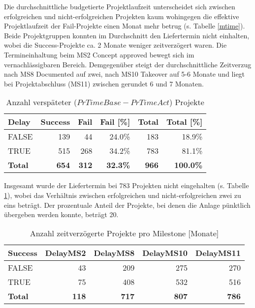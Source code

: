 Die durchschnittliche budgetierte Projektlaufzeit unterscheidet sich zwischen erfolgreichen und  nicht-erfolgreichen Projekten kaum wohingegen die effektive Projektlaufzeit der Fail-Projekte einen Monat mehr betrug (s. Tabelle \ref{mtime}). Beide Projektgruppen konnten im Durchschnitt den Liefertermin nicht einhalten, wobei die Success-Projekte ca. 2 Monate weniger zeitverzögert waren. Die Termineinhaltung beim MS2 Concept approved bewegt sich im vernachlässigbaren Bereich. Demgegenüber steigt der durchschnittliche Zeitverzug nach MS8 Documented auf zwei, nach MS10 Takeover auf 5-6 Monate und liegt bei Projektabschluss (MS11) zwischen gerundet 6 und 7 Monaten.
\begin{table}[H]
	\centering
	\caption{Anzahl verspäteter ($PrTimeBase-PrTimeAct$) Projekte}
	\begin{tabular}{lrrrrr}
		\textbf{Delay} & \multicolumn{1}{l}{\textbf{Success}} & \multicolumn{1}{l}{\textbf{Fail}} & \multicolumn{1}{l}{\textbf{Fail [\%]}} & \multicolumn{1}{l}{\textbf{Total}} & \multicolumn{1}{l}{\textbf{Total [\%]}} \\ \hline
		FALSE & 139   & 44    & 24.0\% & 183   & 18.9\% \\
		TRUE  & 515   & 268   & 34.2\% & 783   & 81.1\% \\\hline
		\textbf{Total} & \textbf{654} & \textbf{312} & \textbf{32.3\%} & \textbf{966} & \textbf{100.0\%} \\
	\end{tabular}%
	\label{fdelay}%
\end{table}%
Insgesamt wurde der Liefertermin bei 783 Projekten nicht eingehalten (s. Tabelle \ref{fdelay}), wobei das Verhältnis zwischen erfolgreichen und nicht-erfolgreichen zwei zu eins beträgt. Der prozentuale Anteil der Projekte, bei denen die Anlage pünktlich übergeben werden konnte, beträgt 20. 
\begin{table}[H]
	\centering
	\caption{Anzahl zeitverzögerte Projekte pro Milestone [Monate]}
	\begin{tabular}{lrrrr}
		\textbf{Success} & \multicolumn{1}{l}{\textbf{DelayMS2}} & \multicolumn{1}{l}{\textbf{DelayMS8}} & \multicolumn{1}{l}{\textbf{DelayMS10}} & \multicolumn{1}{l}{\textbf{DelayMS11}} \\\hline
		FALSE & 43    & 209   & 275   & 270 \\
		TRUE  & 75    & 408   & 532   & 516 \\\hline
		\textbf{Total} & \textbf{118} & \textbf{717} & \textbf{807} &  \textbf{786}
	\end{tabular}%
	\label{fdelayms}%
\end{table}
